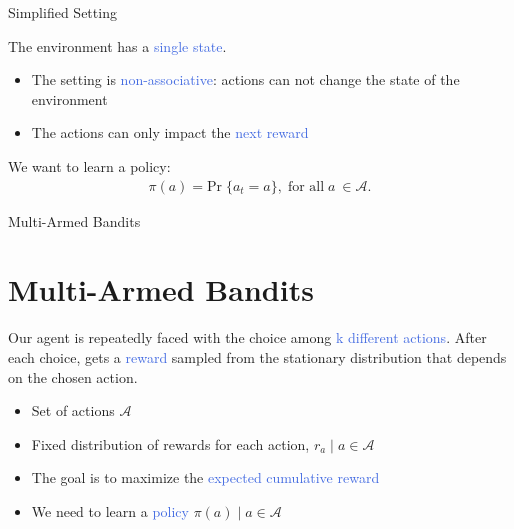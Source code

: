 \documentclass{beamer}
\begin{document}
\begin{frame}{Simplified Setting}

The environment has a \textcolor{RoyalBlue}{single state}.

\vspace{2mm}

\begin{itemize}
    \item The setting is \textcolor{RoyalBlue}{non-associative}: actions can not change the state of the environment
    \item The actions can only impact the \textcolor{RoyalBlue}{next reward}
\end{itemize}

\vspace{2mm}

We want to learn a policy:
\begin{align*}
    \pi(a) = \text{Pr}\; \{a_t = a\}, \; \text{for all}\;  a\: \in \mathcal{A}. 
\end{align*}

\end{frame}


\begin{frame}{Multi-Armed Bandits}
\section{Multi-Armed Bandits}

Our agent is repeatedly faced with the choice among \textcolor{RoyalBlue}{k different actions}. After each choice, gets a \textcolor{RoyalBlue}{reward} sampled from the stationary distribution that depends on the chosen action.

\vspace{3mm}

\begin{itemize}
    \item Set of actions $\mathcal{A}$
    \item Fixed distribution of rewards for each action, $r_a \; |\; a \in \mathcal{A}$
    \item The goal is to maximize the \textcolor{RoyalBlue}{expected cumulative reward}
    \item We need to learn a \textcolor{RoyalBlue}{policy} $\pi(a)\; |\;  a \in \mathcal{A}$
\end{itemize}

\end{frame}
\end{document}
